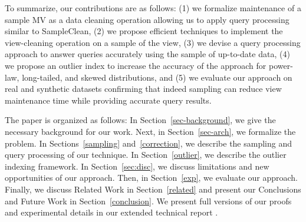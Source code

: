
To summarize, our contributions are as follows: (1) we formalize maintenance of a sample MV as a data cleaning operation allowing us to apply query processing similar to SampleClean, (2) we propose efficient techniques to implement the view-cleaning operation on a sample of the view, (3) we devise a query processing approach to answer queries accurately using the sample of up-to-date data, (4) we propose an outlier index to increase the accuracy of the approach for power-law, long-tailed, and skewed distributions, and (5) we evaluate our approach on real and synthetic datasets confirming that indeed sampling can reduce view maintenance time while providing accurate query results. 

The paper is organized as follows: 
In Section~\ref{sec-background}, we give the necessary background for our work.
Next, in Section~\ref{sec-arch}, we formalize the problem.
In Sections~\ref{sampling} and~\ref{correction}, we describe the sampling and query processing of our technique.
In Section~\ref{outlier}, we describe the outlier indexing framework.
In Section~\ref{sec:disc}, we discuss limitations and new opportunities of our approach.
Then, in Section~\ref{exp}, we evaluate our approach.
Finally, we discuss Related Work in Section~\ref{related} and present our Conclusions and Future Work in Section~\ref{conclusion}.
We present full versions of our proofs and experimental details in our extended technical report \cite{technicalReport}.
